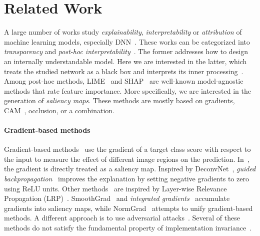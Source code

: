 \section{Related Work}

A large number of works study \emph{explainability}, \emph{interpretability} or \emph{attribution} of machine learning models, especially DNN~\citep{guidotti2018survey, montavon2018methods, samek2021explaining, bodria2021benchmarking, li2021interpretable}. These works can be categorized into \emph{transparency} and \emph{post-hoc interpretability}~\citep{lipton2018mythos, guidotti2018survey}. The former addresses how to design an internally understandable model. Here we are interested in the latter, which treats the studied network as a black box and interprets its inner processing~\citep{ribeiro2016should, lundberg2017unified, fong2017interpretable, elliott2021explaining, selvaraju2017grad, petsiuk2018rise}. Among post-hoc methods, LIME~\citep{ribeiro2016should} and SHAP~\citep{lundberg2017unified} are well-known model-agnostic methods that rate feature importance. More specifically, we are interested in the generation of \emph{saliency maps}. These methods are mostly based on gradients, CAM~\citep{zhou2016learning}, occlusion, or a combination.


\paragraph{Gradient-based methods}

Gradient-based methods~\citep{adebayo2018local,springenberg2014striving,baehrens2010explain} use the gradient of a target class score with respect to the input to measure the effect of different image regions on the prediction. In~\citep{simonyan2013deep}, the gradient is directly treated as a saliency map. Inspired by DeconvNet~\citep{zeiler2014visualizing}, \emph{guided backpropagation}~\citep{springenberg2014striving} improves the explanation by setting negative gradients to zero using ReLU units. Other methods~\citep{shrikumar2017learning, zhang2018top, bastings2020elephant} are inspired by Layer-wise Relevance Propagation (LRP)~\citep{bach2015pixel}. SmoothGrad~\citep{smilkov2017smoothgrad} and \emph{integrated gradients}~\cite{sundararajan2017axiomatic} accumulate gradients into saliency maps, while NormGrad~\citep{rebuffi2020there} attempts to unify gradient-based methods. A different approach is to use adversarial attacks~\citep{elliott2021explaining, jalwana2020attack}. Several of these methods do not satisfy the fundamental property of implementation invariance~\cite{sundararajan2017axiomatic}.

